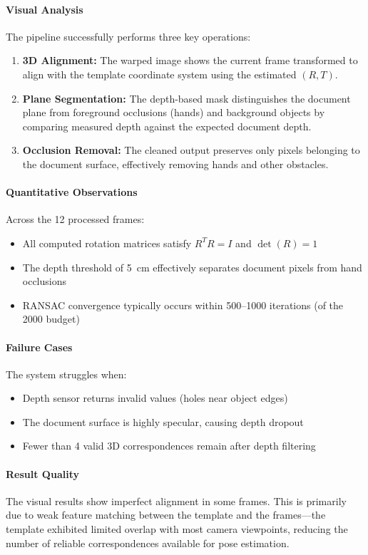 \documentclass[10pt,twocolumn]{extarticle}
\begin{document}
\paragraph{Visual Analysis}
The pipeline successfully performs three key operations:
\begin{enumerate}
    \item \textbf{3D Alignment:} The warped image shows the current frame transformed to align with the template coordinate system using the estimated $(R, T)$.
    \item \textbf{Plane Segmentation:} The depth-based mask distinguishes the document plane from foreground occlusions (hands) and background objects by comparing measured depth against the expected document depth.
    \item \textbf{Occlusion Removal:} The cleaned output preserves only pixels belonging to the document surface, effectively removing hands and other obstacles.
\end{enumerate}

\paragraph{Quantitative Observations}
Across the 12 processed frames:
\begin{itemize}
    \item All computed rotation matrices satisfy $R^T R = I$ and $\det(R) = 1$
    \item The depth threshold of 5~cm effectively separates document pixels from hand occlusions
    \item RANSAC convergence typically occurs within 500--1000 iterations (of the 2000 budget)
\end{itemize}

\paragraph{Failure Cases}
The system struggles when:
\begin{itemize}
    \item Depth sensor returns invalid values (holes near object edges)
    \item The document surface is highly specular, causing depth dropout
    \item Fewer than 4 valid 3D correspondences remain after depth filtering
\end{itemize}

\paragraph{Result Quality}
The visual results show imperfect alignment in some frames. This is primarily due to weak feature matching between the template and the frames---the template exhibited limited overlap with most camera viewpoints, reducing the number of reliable correspondences available for pose estimation.
\end{document}

